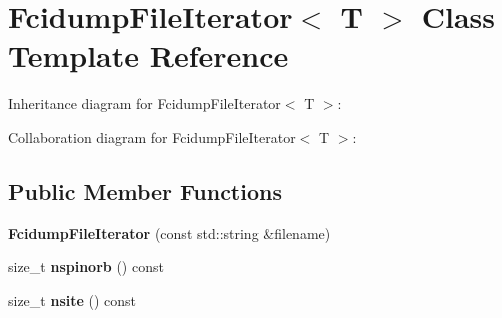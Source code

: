 \hypertarget{classFcidumpFileIterator}{}\section{Fcidump\+File\+Iterator$<$ T $>$ Class Template Reference}
\label{classFcidumpFileIterator}


Inheritance diagram for Fcidump\+File\+Iterator$<$ T $>$\+:


Collaboration diagram for Fcidump\+File\+Iterator$<$ T $>$\+:
\subsection*{Public Member Functions}
\begin{DoxyCompactItemize}
\item 
{\bfseries Fcidump\+File\+Iterator} (const std\+::string \&filename)\hypertarget{classFcidumpFileIterator_ab9e007160da2a4adc8d1e5ecf9f9b3af}{}\label{classFcidumpFileIterator_ab9e007160da2a4adc8d1e5ecf9f9b3af}

\item 
size\+\_\+t {\bfseries nspinorb} () const \hypertarget{classFcidumpFileIterator_a919af803234a9be8ff4554033b78e029}{}\label{classFcidumpFileIterator_a919af803234a9be8ff4554033b78e029}

\item 
size\+\_\+t {\bfseries nsite} () const \hypertarget{classFcidumpFileIterator_ae4cfbdf3629159d5c7b1e46ad27e95b4}{}\label{classFcidumpFileIterator_ae4cfbdf3629159d5c7b1e46ad27e95b4}

\end{DoxyCompactItemize}
